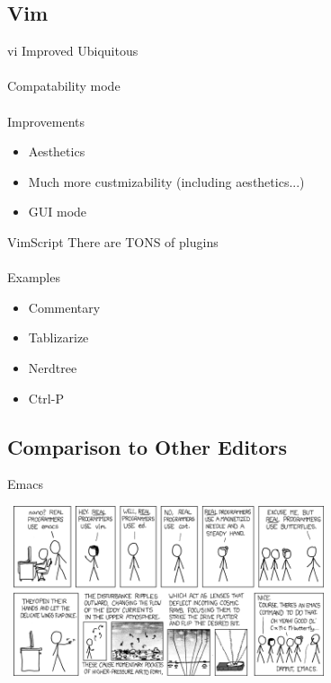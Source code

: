 \documentclass{beamer}
\begin{document}
        \subsection{Vim}

            \begin{frame}{vi Improved}
                Ubiquitous \\~\\
                Compatability mode \\~\\
                Improvements
                \begin{itemize}
                    \item Aesthetics
                    \item Much more custmizability (including aesthetics...)
                    \item GUI mode
                \end{itemize}
            \end{frame}

            \begin{frame}{VimScript}
                There are TONS of plugins \\~\\
                Examples
                \begin{itemize}
                    \item Commentary
                    \item Tablizarize
                    \item Nerdtree
                    \item Ctrl-P
                \end{itemize}
            \end{frame}

        \subsection{Comparison to Other Editors}

            \begin{frame}{Emacs}
                \begin{center}
                \includegraphics[width = 9.5cm, height = 5cm]{images/real_programmers.png}
                \end{center}
            \end{frame}
\end{document}
